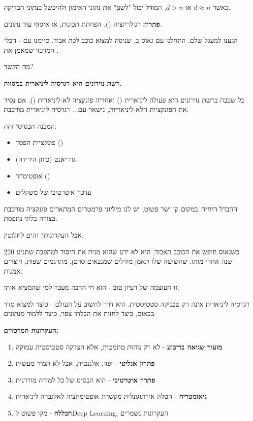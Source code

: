 כאשר $d \approx n$ או $d > n$, המודל יכול "לשנן" את נתוני האימון ולהיכשל בנתוני הבדיקה.

\textbf{פתרון:} רגולריזציה (), הפחתת תכונות, או איסוף עוד נתונים.


הגענו למעגל שלם. התחלנו עם גאוס ב\en{-}, שניסה למצוא כוכב לכת אבוד. סיימנו עם  - הכלי המרכזי שמאמן את .

מה הקשר?

\textbf{רשת נוירונים היא רגרסיה ליניארית במסווה.}

כל שכבה ברשת נוירונים היא פעולה ליניארית () ואחריה פונקציה לא-ליניארית (). אם נסיר את הפונקציות הלא-ליניאריות, נישאר עם... רגרסיה ליניארית מורכבת.

המבנה הבסיסי זהה:
\begin{itemize}
\item פונקציית הפסד ()
\item גרדיאנט (כיוון הירידה)
\item אופטימיזר ()
\item עדכון איטרטיבי של משקלים
\end{itemize}

ההבדל היחיד: במקום קו ישר פשוט, יש לנו מיליוני פרמטרים המתארים פונקציה מורכבת בצורה בלתי נתפסת.

אבל העקרונות? זהים לחלוטין.

כשגאוס חיפש את הכוכב האבוד, הוא לא ידע שהוא מניח את היסוד למהפכה שתגיע \num{220} שנה אחרי מותו. שהשיטה שלו תאמן מודלים שמנבאים סרטן, מתרגמים שפות, ויוצרים אמנות.

זו העוצמה של רעיון טוב - הוא חי הרבה מעבר למי שהמציא אותו.


רגרסיה ליניארית אינה רק טכניקה סטטיסטית. היא דרך לחשוב על העולם - כיצד למצוא סדר בכאוס, כיצד לחזות את הבלתי צפוי, כיצד ללמוד מנתונים.

\textbf{העקרונות המרכזיים:}

\begin{enumerate}
\item \textbf{מזעור שגיאה בריבוע} - לא רק נוחות מתמטית, אלא הצדקה סטטיסטית עמוקה
\item \textbf{פתרון אנליטי} -  יפה, אלגנטית, אבל לא תמיד מעשית
\item \textbf{פתרון איטרטיבי} -  הוא הבסיס של כל למידה מודרנית
\item \textbf{גיאומטריה} - הטלה אורתוגונלית מקשרת אופטימיזציה לאלגברה ליניארית
\item \textbf{הכללה} - מקו פשוט ל\en{-}Deep Learning, העקרונות נשמרים
\end{enumerate}

